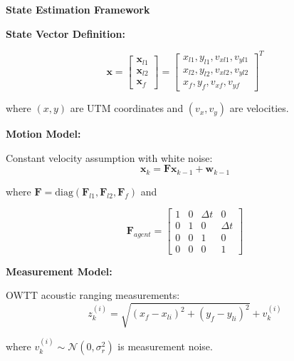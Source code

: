 
\begin{tcolorbox}[colback=waspblue!15, colframe=waspblue, boxrule=1pt, rounded corners]
\large \textbf{State Estimation Framework}
\end{tcolorbox}

\vspace{0.3em}

\textbf{State Vector Definition:}

\begin{tcolorbox}[colback=waspgrey!10, colframe=waspgrey, boxrule=0.5pt]
$$\mathbf{x} = \begin{bmatrix} 
\mathbf{x}_{l1} \\ \mathbf{x}_{l2} \\ \mathbf{x}_f 
\end{bmatrix} = \begin{bmatrix}
x_{l1}, y_{l1}, v_{xl1}, v_{yl1} \\
x_{l2}, y_{l2}, v_{xl2}, v_{yl2} \\
x_f, y_f, v_{xf}, v_{yf}
\end{bmatrix}^T$$
\end{tcolorbox}

where $(x,y)$ are UTM coordinates and $(v_x, v_y)$ are velocities.

\vspace{0.3em}

\textbf{Motion Model:}

Constant velocity assumption with white noise:
$$\mathbf{x}_{k} = \mathbf{F} \mathbf{x}_{k-1} + \mathbf{w}_{k-1}$$

where $\mathbf{F} = \text{diag}(\mathbf{F}_{l1}, \mathbf{F}_{l2}, \mathbf{F}_f)$ and

$$\mathbf{F}_{agent} = \begin{bmatrix}
1 & 0 & \Delta t & 0 \\
0 & 1 & 0 & \Delta t \\
0 & 0 & 1 & 0 \\
0 & 0 & 0 & 1
\end{bmatrix}$$

\vspace{0.3em}

\textbf{Measurement Model:}

OWTT acoustic ranging measurements:
$$z_k^{(i)} = \sqrt{(x_f - x_{li})^2 + (y_f - y_{li})^2} + v_k^{(i)}$$

where $v_k^{(i)} \sim \mathcal{N}(0, \sigma_r^2)$ is measurement noise.

